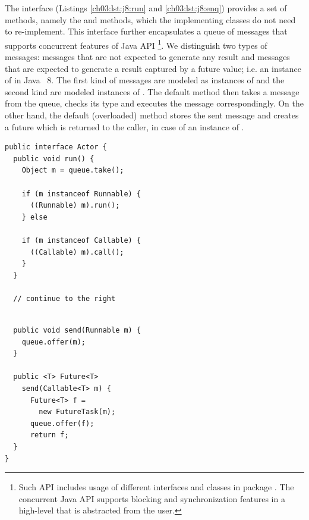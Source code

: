 The  interface (Listings \ref{ch03:lst:j8:run} and \ref{ch03:lst:j8:enq})
provides a set of  methods, namely the  and  methods,  which the implementing classes do not need to re-implement.
This interface further  encapsulates a queue of messages that supports concurrent features of Java API
\footnote{Such API includes usage of different interfaces and classes in  package \cite{jsr166}.
The concurrent Java API supports blocking and synchronization features in a high-level that is abstracted from the user.}.
We distinguish two types of messages:
messages that are  not expected to generate  any result and messages that are  expected to generate a result captured by a future value; i.e. 
an instance of  in Java~ 8.
The first kind of messages are modeled as instances of  and the second kind are modeled instances of .
The default  method then takes a message from the queue, checks its type and executes the message correspondingly.
On the other hand, the default (overloaded)  method stores the sent message and creates a future
which is returned to the caller, in case of an instance of .

\begin{center}
\begin{minipage}[t]{0.48\textwidth}
\begin{lstlisting}[caption=Actor interface (1) ,label=ch03:lst:j8:run]
public interface Actor {
  public void run() {
    Object m = queue.take();

    if (m instanceof Runnable) {
      ((Runnable) m).run();
    } else 

    if (m instanceof Callable) {
      ((Callable) m).call();
    } 
  }

  // continue to the right
\end{lstlisting}
\end{minipage}
\hfill
\begin{minipage}[t]{0.48\textwidth}
\begin{lstlisting}[caption=Actor interface (2),label=ch03:lst:j8:enq]

  public void send(Runnable m) {
    queue.offer(m);
  }

  public <T> Future<T> 
    send(Callable<T> m) {
      Future<T> f = 
        new FutureTask(m);
      queue.offer(f);
      return f;
  }
}
\end{lstlisting}
\end{minipage}
\end{center}

